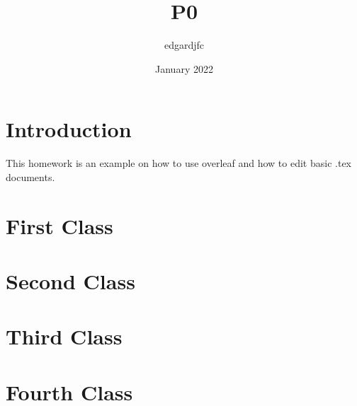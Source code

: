 \documentclass{article}
\title{P0}
\author{edgardjfc }
\date{January 2022}
\begin{document}
\maketitle

\section{Introduction}

This homework is an example on how to use overleaf and how to edit basic .tex documents.

\maketitle

\section{First Class}

\maketitle

\section{Second Class}

\maketitle

\section{Third Class}

\maketitle

\section{Fourth Class}
\end{document}
